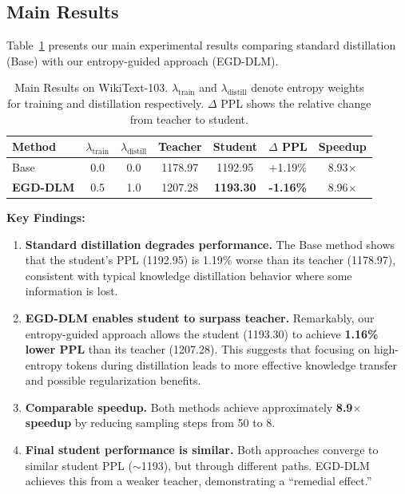 \documentclass[conference]{IEEEtran}
\begin{document}
\subsection{Main Results}

Table~\ref{tab:main_results} presents our main experimental results comparing standard distillation (Base) with our entropy-guided approach (EGD-DLM).

\begin{table}[t]
\centering
\caption{Main Results on WikiText-103. $\lambda_{\text{train}}$ and $\lambda_{\text{distill}}$ denote entropy weights for training and distillation respectively. $\Delta$ PPL shows the relative change from teacher to student.}
\label{tab:main_results}
\scriptsize
\begin{tabular}{lcccccc}
\toprule
\textbf{Method} & $\lambda_{\text{train}}$ & $\lambda_{\text{distill}}$ & \textbf{Teacher} & \textbf{Student} & $\Delta$ \textbf{PPL} & \textbf{Speedup} \\
\midrule
Base & 0.0 & 0.0 & 1178.97 & 1192.95 & +1.19\% & 8.93$\times$ \\
\textbf{EGD-DLM} & 0.5 & 1.0 & 1207.28 & \textbf{1193.30} & \textbf{-1.16\%} & 8.96$\times$ \\
\bottomrule
\end{tabular}
\end{table}

\textbf{Key Findings:}

\begin{enumerate}
    \item \textbf{Standard distillation degrades performance.} The Base method shows that the student's PPL (1192.95) is 1.19\% worse than its teacher (1178.97), consistent with typical knowledge distillation behavior where some information is lost.

    \item \textbf{EGD-DLM enables student to surpass teacher.} Remarkably, our entropy-guided approach allows the student (1193.30) to achieve \textbf{1.16\% lower PPL} than its teacher (1207.28). This suggests that focusing on high-entropy tokens during distillation leads to more effective knowledge transfer and possible regularization benefits.

    \item \textbf{Comparable speedup.} Both methods achieve approximately \textbf{8.9$\times$ speedup} by reducing sampling steps from 50 to 8.

    \item \textbf{Final student performance is similar.} Both approaches converge to similar student PPL ($\sim$1193), but through different paths. EGD-DLM achieves this from a weaker teacher, demonstrating a ``remedial effect.''
\end{enumerate}
\end{document}
